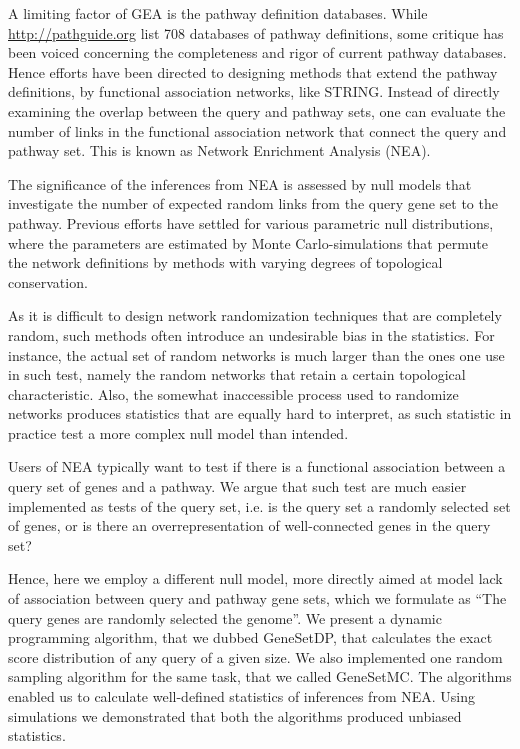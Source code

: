 \documentclass[a4paper,american]{lipics-v2016}
\begin{document}
A limiting factor of GEA is the pathway definition databases. While \url{http://pathguide.org} list 708 databases of pathway definitions\cite{bader2006pathguide},  some critique has been voiced concerning the completeness and rigor of current pathway databases. Hence efforts have been directed to designing methods that extend the pathway definitions, by functional association networks, like STRING\cite{szklarczyk2014string}. Instead of directly examining the overlap between the query and pathway sets, one can evaluate the number of links in the functional association network that connect the query and pathway set\cite{alexeyenko2012network, glaab2012enrichnet, mccormack2013statistical, ogris2016novel, signorelli2016neat}. This is known as Network Enrichment Analysis (NEA).

The significance of the inferences from NEA is assessed by null models that investigate the number of expected random links from the query gene set to the pathway. Previous efforts have settled for various parametric null distributions, where the parameters are estimated by Monte Carlo-simulations that permute the network definitions by methods with varying degrees of topological conservation.

As it is difficult to design network randomization techniques that are completely random, such methods often introduce an undesirable bias in the statistics. For instance, the actual set of random networks is much larger than the ones one use in such test, namely the random networks that retain a certain topological characteristic\cite{newman2001random}. Also, the somewhat inaccessible process used to randomize networks produces statistics that are equally hard to interpret, as such statistic in practice test a more complex null model than intended.

Users of NEA typically want to test if there is a functional association between a query set of genes and a pathway\cite{alexeyenko2012network}. We argue that such test are much easier implemented as tests of the query set, i.e. is the query set a randomly selected set of genes, or is there an overrepresentation of well-connected genes in the query set?

Hence, here we employ a different null model, more directly aimed at model lack of association between query and pathway gene sets, which we formulate as ``The query genes are randomly selected the genome''. We present a dynamic programming algorithm, that we dubbed GeneSetDP, that calculates the exact score distribution of any query of a given size. We also implemented one random sampling algorithm for the same task, that we called GeneSetMC.
The algorithms enabled us to calculate well-defined statistics of inferences from NEA.  Using simulations we demonstrated that both the algorithms produced unbiased statistics.
\end{document}
